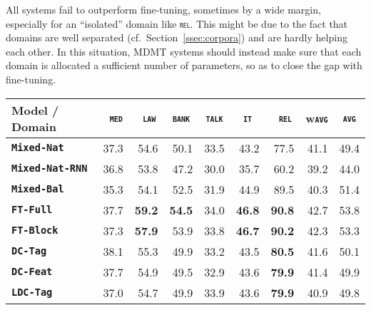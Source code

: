 \documentclass[11pt,a4paper]{article}
\newcommand{\fyDone}[1]{\done[FY]\Todo[FY:]{\textcolor{orange}{#1}}}
\newcommand{\domain}[1]{\texttt{\textsc{#1}}}
\newcommand{\system}[1]{\texttt{\textbf{#1}}}
\newcommand{\SB}[1]{\textbf{#1}}
\newcommand{\SW}[1]{\underline{#1}}
\begin{document}
All systems fail to outperform fine-tuning, sometimes by a wide margin, especially for an ``isolated'' domain like \domain{rel}. This might be due to the fact that domains are well separated (cf.\ Section~\ref{ssec:corpora}) and are hardly helping each other. In this situation, MDMT systems should instead make sure that each domain is allocated a sufficient number of parameters, so as to close the gap with fine-tuning.
\fyDone{More comments when we have all the results}\fyDone{Importance of sharing and unsharing}

\begin{table*}
  \centering
  \fyDone{Fix column size}
  \begin{tabular}{|p{3cm}|*{8}{r|}} \hline
    Model / Domain & \multicolumn{1}{c|}{\domain{ med}} & \multicolumn{1}{c|}{\domain{ law}} & \multicolumn{1}{c|}{\domain{bank}} & \multicolumn{1}{c|}{\domain{talk}} & \multicolumn{1}{c|}{\domain{ it }} & \multicolumn{1}{c|}{\domain{ rel}} & \multicolumn{1}{c|}{w\domain{avg}} & \multicolumn{1}{c|}{\domain{avg}} \\ \hline %
    \system{Mixed-Nat}  & 37.3 & 54.6 & 50.1 & 33.5 & 43.2 & 77.5  & 41.1  & 49.4 \\%
    \system{Mixed-Nat-RNN}  & 36.8 & 53.8 & 47.2 & 30.0 & 35.7 & 60.2  & 39.2  & 44.0 \\
    \system{Mixed-Bal}   &  35.3 & 54.1 & 52.5 & 31.9 & 44.9 & 89.5 & 40.3  & 51.4 \\ %
    \system{FT-Full}       & 37.7 & \SB{59.2} & \SB{54.5} & 34.0 & \SB{46.8} & \SB{90.8}   & 42.7 & 53.8\\
   \system{FT-Block}     & 37.3 & \SB{57.9} & 53.9 & 33.8 & \SB{46.7} & \SB{90.2}  & 42.3 & 53.3 \\ \hline %
    \system{DC-Tag}       & 38.1 & 55.3 & 49.9   & 33.2 & 43.5 & \SB{80.5} &41.6 & 50.1    \\%
    \system{DC-Feat}      & 37.7  & 54.9 & 49.5   & 32.9 & 43.6 & \SB{79.9} &41.4 & 49.9   \\%
    \system{LDC-Tag}     & 37.0   & 54.7 & 49.9 & 33.9 & 43.6 & \SB{79.9} &40.9 & 49.8          \\%

\end{tabular}
\end{table*}
\end{document}
